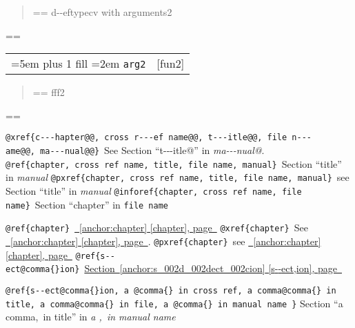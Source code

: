 \documentclass{book}
\makeatletter
\newenvironment{GNUTexinfopreformatted}{%
  \par\GNUTobeylines\obeyspaces\frenchspacing
  \parskip=\z@\parindent=\z@}{}
{\catcode`\^^M=13 \gdef\GNUTobeylines{\catcode`\^^M=13 \def^^M{\null\par}}}
\newenvironment{GNUTexinfoindented}
  {\begin{list}{}{}
  \item\relax}
  {\end{list}}
\makeatother
\begin{document}
\begin{GNUTexinfoindented}
%
\begin{quote}
\unskip{\parskip=0pt\noindent}%
\begin{GNUTexinfopreformatted}%
\ttfamily d{-}{-}eftypecv with arguments2
\end{GNUTexinfopreformatted}
\end{quote}
\begin{GNUTexinfopreformatted}%
\ttfamily 
\end{GNUTexinfopreformatted}

\noindent\begin{tabularx}{\linewidth}{@{}Xr}
\rightskip=5em plus 1 fill
\hangindent=2em
\texttt{arg2}& [fun2]
\end{tabularx}

%
\begin{quote}
\unskip{\parskip=0pt\noindent}%
\begin{GNUTexinfopreformatted}%
\ttfamily fff2
\end{GNUTexinfopreformatted}
\end{quote}
\begin{GNUTexinfopreformatted}%
\ttfamily 

\texttt{@xref\{c{-}{-}{-}hapter@@,\ cross r{-}{-}{-}ef name@@,\ t{-}{-}{-}itle@@,\ file n{-}{-}{-}ame@@,\ ma{-}{-}{-}nual@@\}}\ See Section ``t{-}{-}{-}itle@'' in \textsl{ma{-}{-}{-}nual@}.
\texttt{@ref\{chapter,\ cross ref name,\ title,\ file name,\ manual\}}\ Section ``title'' in \textsl{manual}
\texttt{@pxref\{chapter,\ cross ref name,\ title,\ file name,\ manual\}}\ see Section ``title'' in \textsl{manual}
\texttt{@inforef\{chapter,\ cross ref name,\ file name\}}\ Section ``chapter'' in \texttt{file name}

\texttt{@ref\{chapter\}}\ \hyperref[anchor:chapter]{\chaptername~\ref*{anchor:chapter} [chapter], page~\pageref*{anchor:chapter}}
\texttt{@xref\{chapter\}}\ See \hyperref[anchor:chapter]{\chaptername~\ref*{anchor:chapter} [chapter], page~\pageref*{anchor:chapter}}.
\texttt{@pxref\{chapter\}}\ see \hyperref[anchor:chapter]{\chaptername~\ref*{anchor:chapter} [chapter], page~\pageref*{anchor:chapter}}
\texttt{@ref\{s{-}{-}ect@comma\{\}ion\}}\ \hyperref[anchor:s_002d_002dect_002cion]{Section~\ref*{anchor:s_002d_002dect_002cion} [s{-}{-}ect,ion], page~\pageref*{anchor:s_002d_002dect_002cion}}

\texttt{@ref\{s{-}{-}ect@comma\{\}ion,\ a @comma\{\}\ in cross
ref,\ a comma@comma\{\}\ in title,\ a comma@comma\{\}\ in file,\ a @comma\{\}\ in manual name \}}
Section ``a comma,\ in title'' in \textsl{a ,\ in manual name}


\end{GNUTexinfopreformatted}
\end{GNUTexinfoindented}
\end{document}
